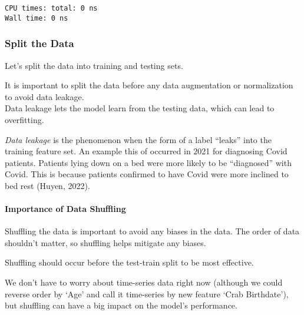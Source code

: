 \documentclass[11pt]{article}
\begin{document}
    \begin{Verbatim}[commandchars=\\\{\}]
CPU times: total: 0 ns
Wall time: 0 ns
    \end{Verbatim}

    \subsubsection{Split the Data}\label{split-the-data}

Let's split the data into training and testing sets.

It is important to split the data before any data augmentation or
normalization to avoid data leakage.\\
Data leakage lets the model learn from the testing data, which can lead
to overfitting.

\emph{Data leakage} is the phenomenon when the form of a label ``leaks''
into the training feature set. An example this of occurred in 2021 for
diagnosing Covid patients. Patients lying down on a bed were more likely
to be ``diagnosed'' with Covid. This is because patients confirmed to
have Covid were more inclined to bed rest (Huyen, 2022).

\paragraph{Importance of Data
Shuffling}\label{importance-of-data-shuffling}

Shuffling the data is important to avoid any biases in the data. The
order of data shouldn't matter, so shuffling helps mitigate any biases.

Shuffling should occur before the test-train split to be most effective.

We don't have to worry about time-series data right now (although we
could reverse order by `Age' and call it time-series by new feature
`Crab Birthdate'), but shuffling can have a big impact on the model's
performance.
\end{document}
